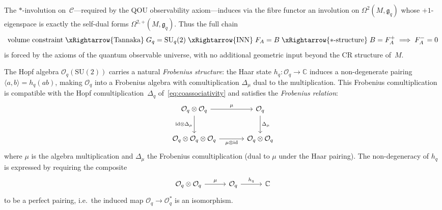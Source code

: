 \begin{remark}
\label{rem:simplicity-from-category}
The $*$-involution on~$\mathcal{C}$---required by the QOU
observability axiom---induces via the fibre functor an involution on
$\Omega^2(M, \mathfrak{g}_q)$ whose $+1$-eigenspace is exactly the
self-dual forms $\Omega^{2,+}(M, \mathfrak{g}_q)$.  Thus the full
chain
\[
  \text{volume constraint}
  \;\xRightarrow{\text{Tannaka}}\;
  G_q = \mathrm{SU}_q(2)
  \;\xRightarrow{\mathrm{INN}}\;
  F_A = B
  \;\xRightarrow{*\text{-structure}}\;
  B = F_A^+
  \;\Longrightarrow\;
  F_A^- = 0
\]
is forced by the axioms of the quantum observable universe, with no
additional geometric input beyond the CR structure of~$M$.
\end{remark}

\begin{remark}
\label{rem:frobenius-simplification}
The Hopf algebra $\mathcal{O}_q(\mathrm{SU}(2))$ carries a natural
\emph{Frobenius structure}: the Haar state
$h_q \colon \mathcal{O}_q \to \mathbb{C}$ induces a non-degenerate
pairing $\langle a, b \rangle = h_q(ab)$, making $\mathcal{O}_q$ into
a Frobenius algebra with comultiplication $\Delta_\mu$ dual to the
multiplication.  This Frobenius comultiplication is compatible with the
Hopf comultiplication~$\Delta_q$ of~\eqref{eq:coassociativity} and
satisfies the \emph{Frobenius relation}:
\begin{equation}\label{eq:frobenius-relation-elab}
\begin{tikzcd}[row sep=2.5em, column sep=3.5em]
  \mathcal{O}_q \otimes \mathcal{O}_q
    \ar[r, "\mu"]
    \ar[d, "\mathrm{id} \otimes \Delta_\mu"']
  & \mathcal{O}_q
    \ar[d, "\Delta_\mu"]
  \\
  \mathcal{O}_q \otimes \mathcal{O}_q \otimes \mathcal{O}_q
    \ar[r, "\mu \otimes \mathrm{id}"']
  & \mathcal{O}_q \otimes \mathcal{O}_q
\end{tikzcd}
\end{equation}
where $\mu$ is the algebra multiplication and $\Delta_\mu$ the
Frobenius comultiplication (dual to $\mu$ under the Haar pairing).
The non-degeneracy of $h_q$ is expressed by requiring the composite
\begin{equation}\label{eq:frobenius-nondegen}
\begin{tikzcd}[column sep=3em]
  \mathcal{O}_q \otimes \mathcal{O}_q
    \ar[r, "\mu"]
  & \mathcal{O}_q
    \ar[r, "h_q"]
  & \mathbb{C}
\end{tikzcd}
\end{equation}
to be a perfect pairing, i.e.\ the induced map
$\mathcal{O}_q \to \mathcal{O}_q^*$ is an isomorphism.


\end{remark}
